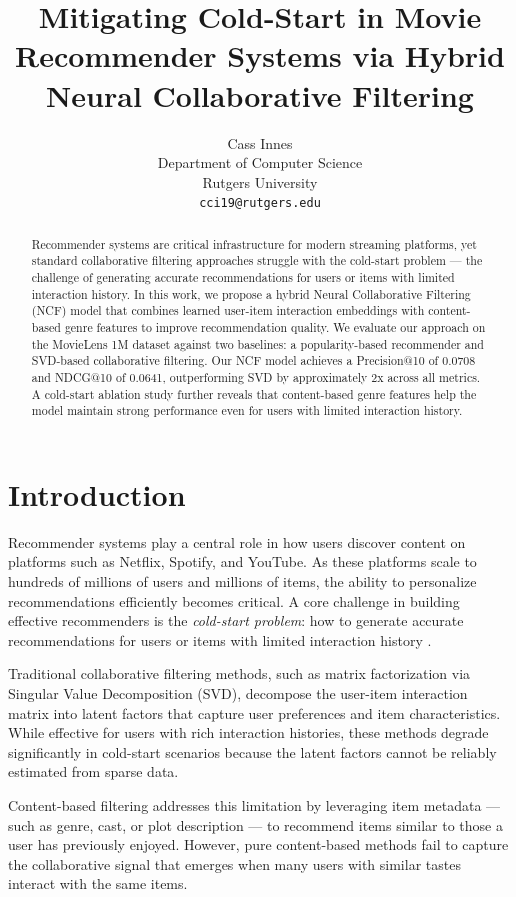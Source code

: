 \documentclass{article}
\title{Mitigating Cold-Start in Movie Recommender Systems via Hybrid Neural Collaborative Filtering}
\author{%
  Cass Innes \\
  Department of Computer Science \\
  Rutgers University \\
  \texttt{cci19@rutgers.edu}
}
\begin{document}
\maketitle

\begin{abstract}
Recommender systems are critical infrastructure for modern streaming platforms, yet standard collaborative filtering approaches struggle with the cold-start problem --- the challenge of generating accurate recommendations for users or items with limited interaction history. In this work, we propose a hybrid Neural Collaborative Filtering (NCF) model that combines learned user-item interaction embeddings with content-based genre features to improve recommendation quality. We evaluate our approach on the MovieLens 1M dataset against two baselines: a popularity-based recommender and SVD-based collaborative filtering. Our NCF model achieves a Precision@10 of 0.0708 and NDCG@10 of 0.0641, outperforming SVD by approximately 2x across all metrics. A cold-start ablation study further reveals that content-based genre features help the model maintain strong performance even for users with limited interaction history.
\end{abstract}

\section{Introduction}
Recommender systems play a central role in how users discover content on platforms such as Netflix, Spotify, and YouTube. As these platforms scale to hundreds of millions of users and millions of items, the ability to personalize recommendations efficiently becomes critical. A core challenge in building effective recommenders is the \textit{cold-start problem}: how to generate accurate recommendations for users or items with limited interaction history \cite{schein2002methods}.

Traditional collaborative filtering methods, such as matrix factorization via Singular Value Decomposition (SVD), decompose the user-item interaction matrix into latent factors that capture user preferences and item characteristics. While effective for users with rich interaction histories, these methods degrade significantly in cold-start scenarios because the latent factors cannot be reliably estimated from sparse data.

Content-based filtering addresses this limitation by leveraging item metadata --- such as genre, cast, or plot description --- to recommend items similar to those a user has previously enjoyed. However, pure content-based methods fail to capture the collaborative signal that emerges when many users with similar tastes interact with the same items.
\end{document}
